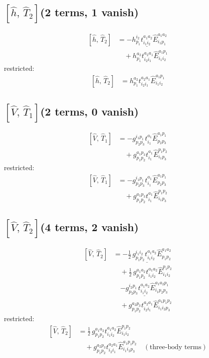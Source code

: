 \documentclass[11pt]{article}
\begin{document}
\subsection*{$\left[\hat{h},\, \hat{T}_{2}\right]$\quad(2 terms, 1 vanish)}
\begin{align}
\left[\hat{h},\, \hat{T}_{2}\right] &= \underline{- h^{i_{2}}_{p_{1}} t^{a_{1}a_{2}}_{i_{1}i_{2}} \hat{E}^{a_{1}a_{2}}_{i_{1}p_{1}}} \\
&\quad + h^{a_{2}}_{p_{1}} t^{a_{2}a_{1}}_{i_{2}i_{1}} \hat{E}^{a_{1}p_{1}}_{i_{1}i_{2}}
\end{align}
restricted:
\begin{align}
\left[\hat{h},\, \hat{T}_{2}\right] &= h^{a_{2}}_{p_{1}} t^{a_{2}a_{1}}_{i_{2}i_{1}} \hat{E}^{a_{1}p_{1}}_{i_{1}i_{2}}
\end{align}
\subsection*{$\left[\hat{V},\, \hat{T}_{1}\right]$\quad(2 terms, 0 vanish)}
\begin{align}
\left[\hat{V},\, \hat{T}_{1}\right] &= - g^{i_{1}p_{1}}_{p_{2}p_{3}} t^{a_{1}}_{i_{1}} \hat{E}^{a_{1}p_{1}}_{p_{2}p_{3}} \\
&\quad + g^{a_{1}p_{3}}_{p_{1}p_{2}} t^{a_{1}}_{i_{1}} \hat{E}^{p_{1}p_{2}}_{i_{1}p_{3}}
\end{align}
restricted:
\begin{align}
\left[\hat{V},\, \hat{T}_{1}\right] &= - g^{i_{1}p_{1}}_{p_{2}p_{3}} t^{a_{1}}_{i_{1}} \hat{E}^{a_{1}p_{1}}_{p_{2}p_{3}} \\
&\quad + g^{a_{1}p_{3}}_{p_{1}p_{2}} t^{a_{1}}_{i_{1}} \hat{E}^{p_{1}p_{2}}_{i_{1}p_{3}}
\end{align}
\subsection*{$\left[\hat{V},\, \hat{T}_{2}\right]$\quad(4 terms, 2 vanish)}
\begin{align}
\left[\hat{V},\, \hat{T}_{2}\right] &= \underline{- \tfrac{1}{2}\, g^{i_{1}i_{2}}_{p_{1}p_{2}} t^{a_{1}a_{2}}_{i_{1}i_{2}} \hat{E}^{a_{1}a_{2}}_{p_{1}p_{2}}} \\
&\quad + \tfrac{1}{2}\, g^{a_{1}a_{2}}_{p_{1}p_{2}} t^{a_{1}a_{2}}_{i_{1}i_{2}} \hat{E}^{p_{1}p_{2}}_{i_{1}i_{2}} \\
&\quad \underline{- g^{i_{2}p_{1}}_{p_{2}p_{3}} t^{a_{1}a_{2}}_{i_{1}i_{2}} \hat{E}^{a_{1}a_{2}p_{1}}_{i_{1}p_{2}p_{3}}} \\
&\quad + g^{a_{2}p_{3}}_{p_{1}p_{2}} t^{a_{2}a_{1}}_{i_{2}i_{1}} \hat{E}^{a_{1}p_{1}p_{2}}_{i_{1}i_{2}p_{3}}
\end{align}
restricted:
\begin{align}
\left[\hat{V},\, \hat{T}_{2}\right] &= \tfrac{1}{2}\, g^{a_{1}a_{2}}_{p_{1}p_{2}} t^{a_{1}a_{2}}_{i_{1}i_{2}} \hat{E}^{p_{1}p_{2}}_{i_{1}i_{2}} \\
&\quad + g^{a_{2}p_{3}}_{p_{1}p_{2}} t^{a_{2}a_{1}}_{i_{2}i_{1}} \hat{E}^{a_{1}p_{1}p_{2}}_{i_{1}i_{2}p_{3}}\quad (\text{three-body terms})
\end{align}
\end{document}
